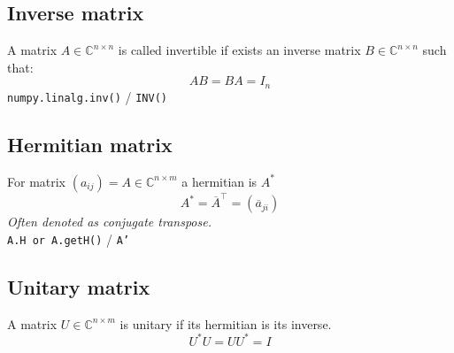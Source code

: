 \subsection{Inverse matrix}
A matrix $A \in \mathbb{C}^{n \times n}$ is called invertible if exists an inverse matrix  $B \in \mathbb{C}^{n \times n}$ such that:
$$AB = BA = I_n$$
\texttt{numpy.linalg.inv()} / \texttt{INV()}

\subsection{Hermitian matrix}
For matrix $(a_{ij}) = A \in \mathbb{C}^{n \times m}$  a hermitian is $A^*$
$$A^* = \overline{A}^\top = (\overline{a}_{ji})$$
\textit{Often denoted as conjugate transpose.} \\ 
\texttt{A.H or A.getH()} / \texttt{A'}

\subsection{Unitary matrix}
A matrix $U \in \mathbb{C}^{n \times m}$ is unitary if its hermitian is its inverse.
$$U^*U = UU^* = I$$